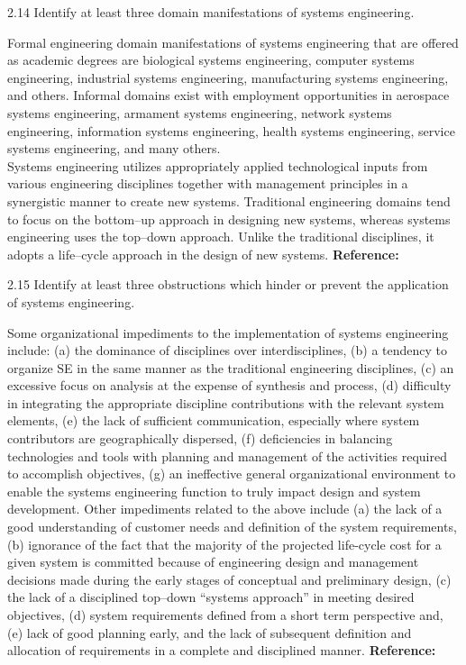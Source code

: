 \begin{exsol@exercise}{2.14}
    \label{sea-2-22}
        Identify at least three domain manifestations of systems engineering.
\end{exsol@exercise}
\begin{exsol@solution}{}
        Formal engineering domain manifestations of systems engineering that are offered as academic degrees are biological systems engineering, computer systems engineering, industrial systems engineering, manufacturing systems engineering, and others. Informal domains exist with employment opportunities in aerospace systems engineering, armament systems engineering, network systems engineering, information systems engineering, health systems engineering, service systems engineering, and many others. \\
        Systems engineering utilizes appropriately applied technological inputs from various engineering disciplines together with management principles in a synergistic manner to create new systems. Traditional engineering domains tend to focus on the bottom–up approach in designing new systems, whereas systems engineering uses the top–down approach. Unlike the traditional disciplines, it adopts a life–cycle approach in the design of new systems. \textbf{Reference:}
\end{exsol@solution}
\begin{exsol@exercise}{2.15}
    \label{sea-2-23}
        Identify at least three obstructions which hinder or prevent the application of systems engineering.
\end{exsol@exercise}
\begin{exsol@solution}{}
        Some organizational impediments to the implementation of systems engineering include: (a) the dominance of disciplines over interdisciplines, (b) a tendency to organize SE in the same manner as the traditional engineering disciplines, (c) an excessive focus on analysis at the expense of synthesis and process, (d) difficulty in integrating the appropriate discipline contributions with the relevant system elements, (e) the lack of sufficient communication, especially where system contributors are geographically dispersed, (f) deficiencies in balancing technologies and tools with planning and management of the activities required to accomplish objectives, (g) an ineffective general organizational environment to enable the systems engineering function to truly impact design and system development. Other impediments related to the above include (a) the lack of a good understanding of customer needs and definition of the system requirements, (b) ignorance of the fact that the majority of the projected life-cycle cost for a given system is committed because of engineering design and management decisions made during the early stages of conceptual and preliminary design, (c) the lack of a disciplined top–down “systems approach” in meeting desired objectives, (d) system requirements defined from a short term perspective and, (e) lack of good planning early, and the lack of subsequent definition and allocation of requirements in a complete and disciplined manner. \textbf{Reference:}
\end{exsol@solution}
